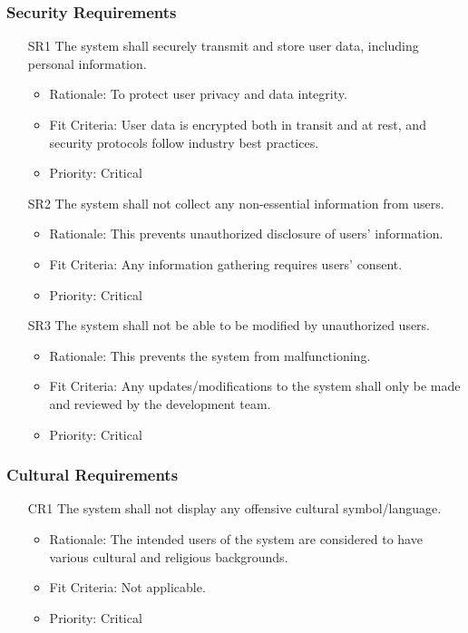 \documentclass[12pt]{article}
\begin{document}
\subsubsection{Security Requirements}
\begin{itemize}
    \item[SR1] The system shall securely transmit and store user data, including personal information. \label{SR1}
    \begin{itemize}
        \item Rationale: To protect user privacy and data integrity.
        \item Fit Criteria: User data is encrypted both in transit and at rest, and security protocols follow industry best practices.
        \item Priority: Critical
    \end{itemize}
\end{itemize}
\begin{itemize}
    \item[SR2] The system shall not collect any non-essential information from users. \label{SR2}
    \begin{itemize}
        \item Rationale: This prevents unauthorized disclosure of users' information.
        \item Fit Criteria: Any information gathering requires users’ consent.
        \item Priority: Critical
    \end{itemize}
\end{itemize}
\begin{itemize}
    \item[SR3] The system shall not be able to be modified by unauthorized users. \label{SR3}
    \begin{itemize}
        \item Rationale:  This prevents the system from malfunctioning.
        \item Fit Criteria: Any updates/modifications to the system shall only be
made and reviewed by the development team.
        \item Priority: Critical
    \end{itemize}
\end{itemize}
\subsubsection{Cultural Requirements}
\begin{itemize}
    \item[CR1] The system shall not display any offensive cultural symbol/language. \label{CR1}
    \begin{itemize}
        \item Rationale: The intended users of the system are considered to have various cultural and religious backgrounds.
        \item Fit Criteria: Not applicable.
        \item Priority: Critical
    \end{itemize}
\end{itemize}
\end{document}
